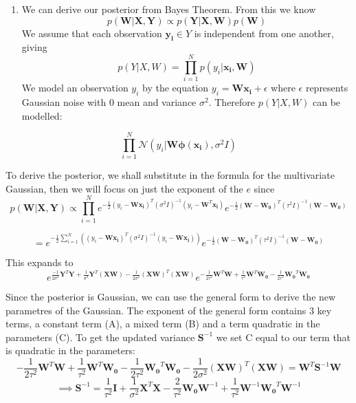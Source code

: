 \documentclass[11pt]{article}
\providecommand{\tightlist}{%
      \setlength{\itemsep}{0pt}\setlength{\parskip}{0pt}}
\begin{document}
\begin{enumerate}
\def\labelenumi{\alph{enumi})}
\tightlist
\item
  We can derive our posterior from Bayes Theorem. From this we know
  \[ p(\boldsymbol{W} | \boldsymbol{X}, \boldsymbol{Y}) \propto p(\boldsymbol{Y} | \boldsymbol{X}, \boldsymbol{W})p(\boldsymbol{W}) \]
  We assume that each observation \(\boldsymbol{y_i} \in Y\) is
  independent from one another, giving
  \[ p(Y | X, W) = \prod^{N}_{i=1} p(y_i | \boldsymbol{x_i}, \boldsymbol{W}) \]
  We model an observation \(y_i\) by the equation
  \(y_i = \boldsymbol{W} \boldsymbol{x_i} + \epsilon\) where
  \(\epsilon\) represents Gaussian noise with \(0\) mean and variance
  \(\sigma^2\). Therefore \(p(Y | X, W)\) can be modelled:
\end{enumerate}

\[ \prod^N_{i=1} \mathcal{N}(y_i | \boldsymbol{W} \boldsymbol{\phi (x_i)}, \sigma^2 I)\]

To derive the posterior, we shall substitute in the formula for the
multivariate Gaussian, then we will focus on just the exponent of the
\(e\) since
\[p(\boldsymbol{W}| \boldsymbol{X}, \boldsymbol{Y}) \propto \prod^N_{i=1} e^{-\frac{1}{2}(y_i - \boldsymbol{W} \boldsymbol{x_i})^T(\sigma^2 I)^{-1}(y_i - \boldsymbol{W}^T \boldsymbol{x_i})} e^{-\frac{1}{2}(\boldsymbol{W} - \boldsymbol{W_0})^T(\tau^2 I)^{-1}(\boldsymbol{W}-\boldsymbol{W_0})}\]

\[ = e^{-\frac{1}{2}\sum^N_{i=1}((y_i - \boldsymbol{W} \boldsymbol{x_i})^T(\sigma^2 I)^{-1}(y_i - \boldsymbol{W} \boldsymbol{x_i}))} e^{-\frac{1}{2}(\boldsymbol{W} - \boldsymbol{W_0})^T(\tau^2 I)^{-1}(\boldsymbol{W}-\boldsymbol{W_0})} \]

This expands to
\[ e^{\frac{-1}{2 \sigma^2}\boldsymbol{Y}^T \boldsymbol{Y} + \frac{1}{\sigma^2} \boldsymbol{Y}^T (\boldsymbol{X W}) - \frac{1}{2 \sigma^2}(\boldsymbol{X W})^T (\boldsymbol{X W})} e^{-\frac{1}{2\tau^2}\boldsymbol{W}^T\boldsymbol{W} + \frac{1}{\tau^2}\boldsymbol{W}^T\boldsymbol{W_0} - \frac{1}{2\tau^2}\boldsymbol{W_0}^T\boldsymbol{W_0}} \]

Since the posterior is Gaussian, we can use the general form to derive
the new parametres of the Gaussian. The exponent of the general form
contains 3 key terms, a constant term (A), a mixed term (B) and a term
quadratic in the parameters (C). To get the updated variance
\(\boldsymbol{S}^{-1}\) we set C equal to our term that is quadratic in
the parameters:
\[ -\frac{1}{2 \tau^2}\boldsymbol{W}^T\boldsymbol{W} + \frac{1}{\tau^2}\boldsymbol{W}^T\boldsymbol{W_0} - \frac{1}{2\tau^2}\boldsymbol{W_0}^T\boldsymbol{W_0} - \frac{1}{2\sigma^2}(\boldsymbol{XW})^T(\boldsymbol{XW}) = \boldsymbol{W}^T\boldsymbol{S}^{-1}\boldsymbol{W}\]
\[\implies \boldsymbol{S}^{-1} = \frac{1}{\tau^2}\boldsymbol{I} + \frac{1}{\sigma^2}\boldsymbol{X}^T\boldsymbol{X} -\frac{2}{\tau^2} \boldsymbol{W_0}\boldsymbol{W}^{-1} + \frac{1}{\tau^2}\boldsymbol{W}^{-1}\boldsymbol{W_0}^T\boldsymbol{W}^{-1}\]
\end{document}
